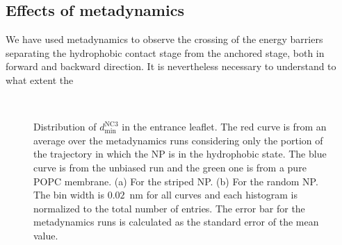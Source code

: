 \subsection{Effects of metadynamics}
We have used metadynamics to observe the crossing of the energy barriers separating the hydrophobic contact stage from the anchored stage, both in forward and backward direction. It is nevertheless necessary to understand to what extent the 
\begin{figure}[hb!]
	\center
	\\%
	\caption{Distribution of $d_\text{min}^{\text{NC}3}$ in the entrance leaflet. The red curve is from an average over the metadynamics runs considering only the portion of the trajectory in which the \acs{NP} is in the hydrophobic state. The blue curve is from the unbiased run and the green one is from a pure \acs{POPC} membrane. (a) For the striped \acs{NP}. (b) For the random \acs{NP}. The bin width is $0.02$~nm for all curves and each histogram is normalized to the total number of entries. The error bar for the metadynamics runs is calculated as the standard error of the mean value.}%
	\label{fig:NC3minDistUn}
\end{figure}
